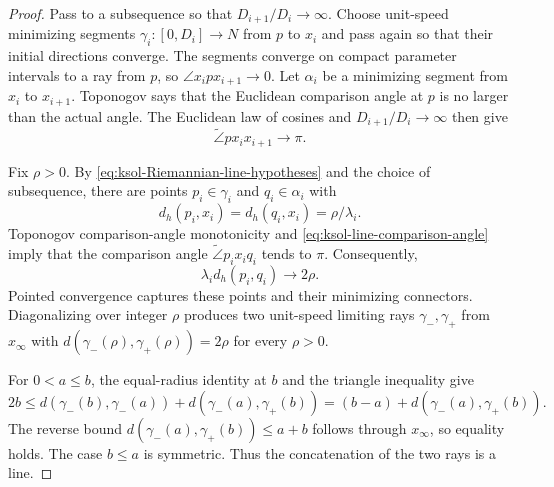 \documentclass[10pt]{coll-l}
\theoremstyle{definition}
\theoremstyle{remark}
\numberwithin{section}{chapter}
\numberwithin{equation}{chapter}
\begin{document}
\begin{proof}
Pass to a subsequence so that $D_{i+1}/D_i\to\infty$.  Choose unit-speed
minimizing segments $\gamma_i:[0,D_i]\to N$ from $p$ to $x_i$ and pass
again so that their initial directions converge.  The segments converge on
compact parameter intervals to a ray from $p$, so
$\angle x_i p x_{i+1}\to0$.  Let $\alpha_i$ be a minimizing segment from
$x_i$ to $x_{i+1}$.  Toponogov says that the Euclidean comparison angle at
$p$ is no larger than the actual angle.  The Euclidean law of cosines and
$D_{i+1}/D_i\to\infty$ then give
\begin{equation}
                  \widetilde\angle p x_i x_{i+1}\longrightarrow\pi.
                                                               \label{eq:ksol-line-comparison-angle}
\end{equation}

Fix $\rho>0$.  By \eqref{eq:ksol-Riemannian-line-hypotheses} and the
choice of subsequence, there are points $p_i\in\gamma_i$ and
$q_i\in\alpha_i$ with
\[
              d_h(p_i,x_i)=d_h(q_i,x_i)=\rho/\lambda_i.
\]
Toponogov comparison-angle monotonicity and
\eqref{eq:ksol-line-comparison-angle} imply that the comparison angle
$\widetilde\angle p_i x_i q_i$ tends to $\pi$.  Consequently,
\begin{equation}
                         \lambda_i d_h(p_i,q_i)\longrightarrow2\rho.
                                                               \label{eq:ksol-line-distance-equality}
\end{equation}
Pointed convergence captures these points and their minimizing connectors.
Diagonalizing over integer $\rho$ produces two unit-speed limiting rays
$\gamma_-,\gamma_+$ from $x_\infty$ with
$d(\gamma_-(\rho),\gamma_+(\rho))=2\rho$ for every $\rho>0$.

For $0<a\leq b$, the equal-radius identity at $b$ and the triangle
inequality give
\[
 2b\leq d(\gamma_-(b),\gamma_-(a))
       +d(\gamma_-(a),\gamma_+(b))
 =(b-a)+d(\gamma_-(a),\gamma_+(b)).
\]
The reverse bound
$d(\gamma_-(a),\gamma_+(b))\leq a+b$ follows through $x_\infty$, so
equality holds.  The case $b\leq a$ is symmetric.  Thus the concatenation
of the two rays is a line.
\end{proof}
\end{document}
